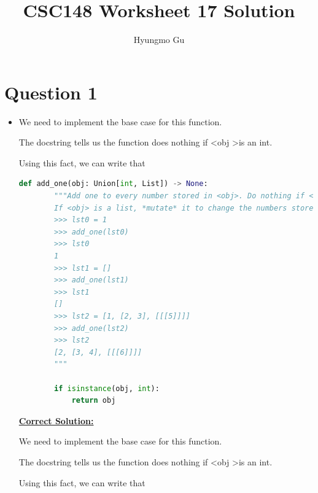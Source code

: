 \documentclass[12pt]{article}
\begin{document}
\title{CSC148 Worksheet 17 Solution}
\author{Hyungmo Gu}
\maketitle

\section*{Question 1}
\begin{itemize}
    \item

    We need to implement the base case for this function.

    \bigskip

    The docstring tells us the function does nothing if \textless obj \textgreater is an int.

    \bigskip

    Using this fact, we can write that

    \bigskip

    \begin{lstlisting}[language=python,caption={worksheet\_17\_q1\_solution.py}]
    def add_one(obj: Union[int, List]) -> None:
        """Add one to every number stored in <obj>. Do nothing if <obj> is an int.
        If <obj> is a list, *mutate* it to change the numbers stored.
        >>> lst0 = 1
        >>> add_one(lst0)
        >>> lst0
        1
        >>> lst1 = []
        >>> add_one(lst1)
        >>> lst1
        []
        >>> lst2 = [1, [2, 3], [[[5]]]]
        >>> add_one(lst2)
        >>> lst2
        [2, [3, 4], [[[6]]]]
        """

        if isinstance(obj, int):
            return obj
    \end{lstlisting}

    \bigskip

    \begin{mdframed}
        \underline{\textbf{Correct Solution:}}

        \bigskip

        We need to implement the base case for this function.

        \bigskip

        The docstring tells us the function does nothing if \textless obj \textgreater is an int.

        \bigskip

        Using this fact, we can write that

        \bigskip


\end{mdframed}
\end{itemize}
\end{document}
